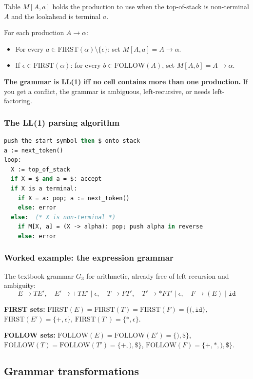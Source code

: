 \documentclass[11pt,a4paper]{article}
\begin{document}
Table $M[A, a]$ holds the production to use when the top-of-stack is non-terminal $A$ and the lookahead is terminal $a$.

For each production $A \to \alpha$:
\begin{itemize}[leftmargin=*,itemsep=0pt]
  \item For every $a \in \text{FIRST}(\alpha) \setminus \{\epsilon\}$: set $M[A, a] = A \to \alpha$.
  \item If $\epsilon \in \text{FIRST}(\alpha)$: for every $b \in \text{FOLLOW}(A)$, set $M[A, b] = A \to \alpha$.
\end{itemize}

\textbf{The grammar is LL(1) iff no cell contains more than one production.} If you get a conflict, the grammar is ambiguous, left-recursive, or needs left-factoring.

\subsubsection*{The LL(1) parsing algorithm}

\begin{lstlisting}[language=ocaml]
push the start symbol then $ onto stack
a := next_token()
loop:
  X := top_of_stack
  if X = $ and a = $: accept
  if X is a terminal:
    if X = a: pop; a := next_token()
    else: error
  else:  (* X is non-terminal *)
    if M[X, a] = (X -> alpha): pop; push alpha in reverse
    else: error
\end{lstlisting}

\subsubsection*{Worked example: the expression grammar}

The textbook grammar $G_3$ for arithmetic, already free of left recursion and ambiguity:
$$E \to T E', \quad E' \to {+} T E' \mid \epsilon, \quad T \to F T', \quad T' \to {*} F T' \mid \epsilon, \quad F \to (E) \mid \texttt{id}$$

\textbf{FIRST sets:} $\text{FIRST}(E) = \text{FIRST}(T) = \text{FIRST}(F) = \{(, \texttt{id}\}$, $\text{FIRST}(E') = \{+, \epsilon\}$, $\text{FIRST}(T') = \{*, \epsilon\}$.

\textbf{FOLLOW sets:} $\text{FOLLOW}(E) = \text{FOLLOW}(E') = \{), \$\}$, $\text{FOLLOW}(T) = \text{FOLLOW}(T') = \{+, ), \$\}$, $\text{FOLLOW}(F) = \{+, *, ), \$\}$.

\subsection{Grammar transformations}
\end{document}
